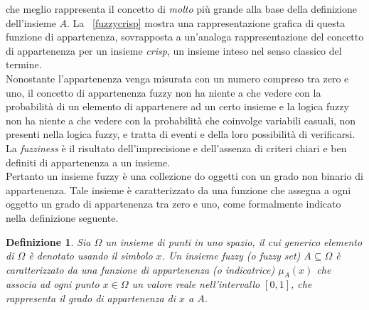 \documentclass [11pt,a4paper,twoside,openright] {book}
\newtheorem{fuzzyset}{Definizione}
\begin{document}
che meglio rappresenta il concetto di \textit{molto} più grande alla base della definizione dell'insieme $A$. La \figurename~\ref{fuzzycrisp} mostra una rappresentazione grafica di questa funzione di appartenenza, sovrapposta a un'analoga rappresentazione del concetto di appartenenza per un insieme \textit{crisp}, un insieme inteso nel senso classico del termine.\\
Nonostante l'appartenenza venga misurata con un numero compreso tra zero e uno, il concetto di appartenenza fuzzy non ha niente a che vedere con la probabilità di un elemento di appartenere ad un certo insieme e la logica fuzzy non ha niente a che vedere con la probabilità che coinvolge variabili casuali, non presenti nella logica fuzzy, e tratta di eventi e della loro possibilità di verificarsi. La \textit{fuzziness} è il risultato dell'imprecisione e dell'assenza di criteri chiari e ben definiti di appartenenza a un insieme.\\
Pertanto un insieme fuzzy è una collezione do oggetti con un grado non binario di appartenenza. Tale insieme è caratterizzato da una funzione che assegna a ogni oggetto un grado di appartenenza tra zero e uno, come formalmente indicato nella definizione seguente\cite{zadeh1965fuzzy}.
\begin{fuzzyset}
Sia $\Omega$ un insieme di punti in uno spazio, il cui generico elemento di $\Omega$ è denotato usando il simbolo $x$. Un \textit{insieme fuzzy} (o \textit{fuzzy set}) $A \subseteq \Omega$ è caratterizzato da una funzione di \textit{appartenenza} (o \textit{indicatrice}) $\mu_{A}(x)$ che associa ad ogni punto $x \in \Omega$ un valore reale nell'intervallo $[0,1]$, che rappresenta il \textit{grado di appartenenza} di $x$ a $A$.
\end{fuzzyset}
\end{document}
